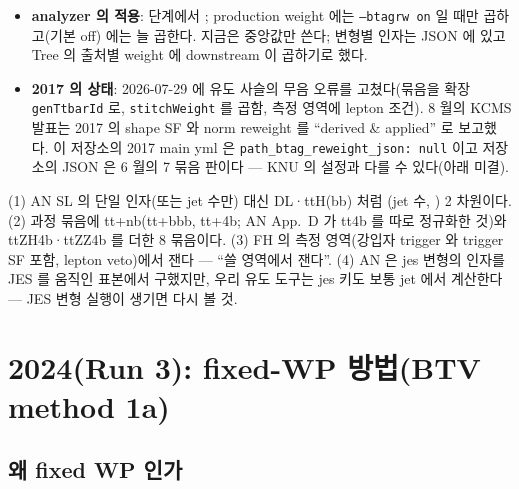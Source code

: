 \begin{itemize}
  \HT{} 경계는 500, 550, 600, 700, 800, 1000, 1100, …, 1800, 2100, 2500\GeV(범위 밖 clamp), 빈 bin 은 1 이다. 변형 키는 central 과
  up/down $\times$ \{lf, hf, hfstats1/2, lfstats1/2, cferr1/2, jes\} 의 19 개다\tagimpl.
  출력은 correctionlib JSON (묶음 8 개)이다.
\item \textbf{analyzer 의 적용}: \HT{} 단계에서 ; production weight 에는
  \texttt{--btagrw on} 일 때만 곱하고(기본 off)  에는 늘 곱한다. 지금은 중앙값만 쓴다; 변형별 인자는 JSON 에 있고
  Tree 의 출처별 weight 에 downstream 이 곱하기로 했다\tagimpl.
\item \textbf{2017 의 상태}: 2026-07-29 에 유도 사슬의 무음 오류를 고쳤다(묶음을 확장 \texttt{genTtbarId} 로, \texttt{stitchWeight} 를 곱함,
  측정 영역에 lepton 조건). 8 월의 KCMS 발표는 2017 의 shape SF 와 norm reweight 를 ``derived \& applied'' 로
  보고했다. 이 저장소의 2017 main yml 은 \texttt{path\_btag\_reweight\_json: null} 이고 저장소의 JSON 은 6 월의 7 묶음
  판이다 --- KNU 의 설정과 다를 수 있다(아래 미결).
\end{itemize}

\begin{andiff}
(1) AN SL 의 단일 인자(또는 jet 수만) 대신 DL·ttH(bb) 처럼 (jet 수, \HT) 2 차원이다. (2) 과정 묶음에 tt+nb(tt+bbb, tt+4b; AN App.~D 가 tt4b
를 따로 정규화한 것)와 ttZH4b·ttZZ4b 를 더한 8 묶음이다\tagours. (3) FH 의 측정 영역(강입자 trigger 와 trigger SF 포함, lepton veto)에서
잰다 --- ``쓸 영역에서 잰다''. (4) AN 은 jes 변형의 인자를 JES 를 움직인 표본에서 구했지만, 우리 유도 도구는
jes 키도 보통 jet 에서 계산한다 --- JES 변형 실행이 생기면 다시 볼 것\tagours.
\end{andiff}

\section{2024(Run 3): fixed-WP 방법(BTV method 1a)}\label{sec:btag-fixedwp}

\subsection{왜 fixed WP 인가}\label{sec:btag-why-fixedwp}

